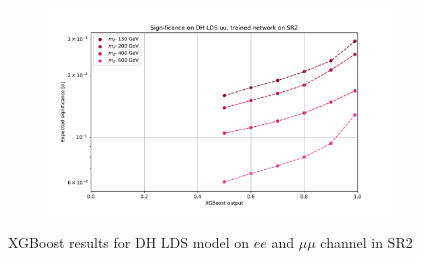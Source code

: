 \documentclass[12pt, a4paper]{book}
\begin{document}
\begin{figure}[!ht]
\begin{subfigure}[b]{0.49\textwidth}
   \end{subfigure}
   \hfill
   \begin{subfigure}[b]{0.49\textwidth}
      \centering
      \includegraphics[width=1\textwidth]{XGBoost/Model_independent/100-150/DH_LDS/EXP_SIG_uu.pdf}
   \end{subfigure}
   \caption{XGBoost results for DH LDS model on $ee$ and $\mu\mu$ channel in SR2}\label{fig:DH_LDS_SR2}
\end{figure}
\end{document}
